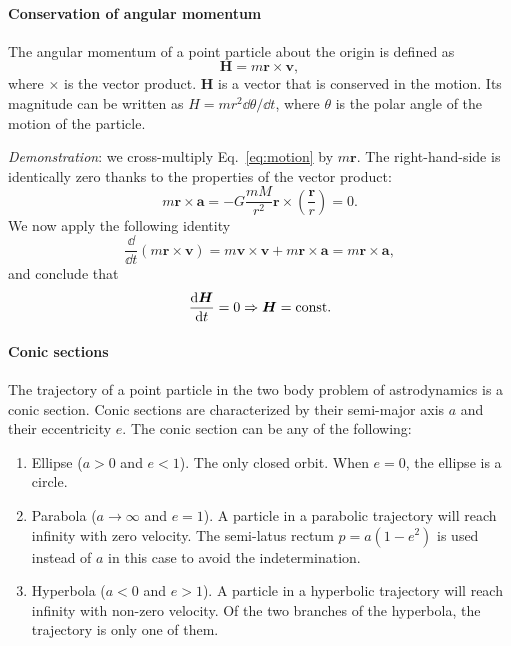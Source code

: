 \paragraph{Conservation of angular momentum}

The angular momentum of a point particle about the origin is defined as
%
\begin{equation}
\bm H = m\bm r \times \bm v,
\end{equation}
%
where $\times$ is the vector product. $\bm H$ is a vector that is conserved in 
the motion. Its magnitude can be written as $H=mr^2 \dd \theta/\dd t$, where 
$\theta$ is the polar angle of the motion of the particle.

\emph{Demonstration}: we cross-multiply Eq.~\eqref{eq:motion} by $m\bm r$. The 
right-hand-side is identically zero thanks to the properties of the vector 
product:
%
\begin{equation}
m\bm r\times \bm a
= - G\frac{mM}{r^2}\bm r\times \left(\frac{\bm r}{r}\right) = 0.
\end{equation}
%
We now apply the following identity
%
\begin{equation}
\frac{\dd}{\dd t}\left(m\bm r \times \bm v\right) 
= m \bm v \times \bm v + m\bm r \times \bm a =  m\bm r \times \bm a,
\end{equation}
%
and conclude that
%
\begin{equation}
\frac{\mathrm{d} \bm H}{\mathrm{d} t} = 0 \Rightarrow \bm H = \text{const}.
\end{equation}

\paragraph{Conic sections}

The trajectory of a point particle in the two body problem of astrodynamics
is a conic section. Conic sections are characterized by their semi-major axis 
$a$ and their eccentricity $e$. The conic section can be any of the following:
%
\begin{enumerate}
\item Ellipse ($a>0$ and $e<1$). The only closed orbit. When $e=0$, the 
ellipse is a circle.
\item Parabola ($a\to \infty$ and $e=1$). A particle in a parabolic trajectory 
will reach infinity with zero velocity. The semi-latus rectum $p=a(1-e^2)$ 
is used instead of $a$ in this case to avoid the indetermination.
\item Hyperbola ($a<0$ and $e>1$). A particle in a hyperbolic trajectory 
will reach infinity with non-zero velocity. Of the two branches of the 
hyperbola, the trajectory is only one of them.
\end{enumerate}
% 

